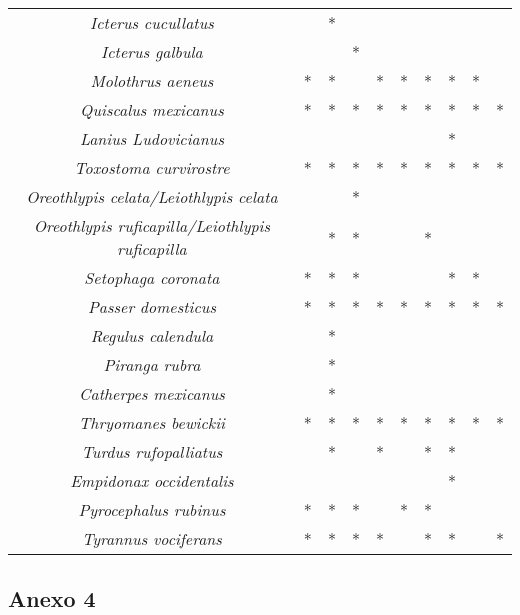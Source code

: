 \documentclass[letterpaper,12pt]{article}
\begin{document}
{\begin{longtable}[c] {|c|c|c|c|c|c|c|c|c|c|}
\textit{Icterus cucullatus} &  &  * &  & & & & & & \\
\textit{Icterus galbula} &  &  & * & & & & & & \\
\textit{Molothrus aeneus} & * & * &  & * & * & * & * & * &\\
\textit{Quiscalus mexicanus} & * & * & * & * & * & * & * & * &* \\
\textit{Lanius Ludovicianus} &  &  &  & & & &* & & \\
\textit{Toxostoma curvirostre} & * &  * & * & * & * & * & * &* &* \\
\textit{Oreothlypis celata/Leiothlypis celata} &  &  & * & & & & & & \\
\textit{Oreothlypis ruficapilla/Leiothlypis ruficapilla} &  & * & * & & &* & & & \\
\textit{Setophaga coronata} & * & * & * & & & &* & * & \\
\textit{Passer domesticus} & * & * & * & * & * & * & * & * &*  \\
\textit{Regulus calendula} &  & * &  & & & & & & \\
\textit{Piranga rubra} &  & * &  & & & & & & \\
\textit{Catherpes mexicanus} &  & * &  & & & & & & \\
\textit{Thryomanes  bewickii} & * & * & * & * & * & * & * & * &*\\
\textit{Turdus rufopalliatus} &  & * &  & * & &* & * & & \\
\textit{Empidonax occidentalis} &  &  &  & & & &* & & \\
\textit{Pyrocephalus rubinus} & * & * & * &  & * &* & & & \\
\textit{Tyrannus vociferans} & * & * & * & * & &* & * & &* \\
 
\end{longtable}
}
\subsection{Anexo 4}
\end{document}
